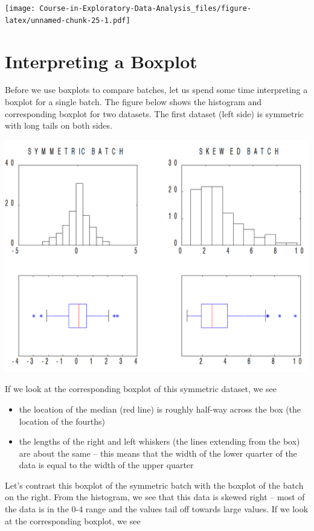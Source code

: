 \documentclass[
]{book}
\providecommand{\tightlist}{%
  \setlength{\itemsep}{0pt}\setlength{\parskip}{0pt}}
\begin{document}
\texttt{[image: Course-in-Exploratory-Data-Analysis\_files/figure-latex/unnamed-chunk-25-1.pdf]}

\hypertarget{interpreting-a-boxplot}{%
\section{Interpreting a Boxplot}\label{interpreting-a-boxplot}}

Before we use boxplots to compare batches, let us spend some time interpreting a boxplot for a single batch. The figure below shows the histogram and corresponding boxplot for two datasets. The first dataset (left side) is symmetric with long tails on both sides.

\includegraphics[width=0.8\linewidth]{figures/comparison/boxplot6}

If we look at the corresponding boxplot of this symmetric dataset, we see

\begin{itemize}
\tightlist
\item
  the location of the median (red line) is roughly half-way across the box (the location of the fourths)
\item
  the lengths of the right and left whiskers (the lines extending from the box) are about the same -- this means that the width of the lower quarter of the data is equal to the width of the upper quarter
\end{itemize}

Let's contrast this boxplot of the symmetric batch with the boxplot of the batch on the right. From the histogram, we see that this data is skewed right -- most of the data is in the 0-4 range and the values tail off towards large values. If we look at the corresponding boxplot, we see
\end{document}

